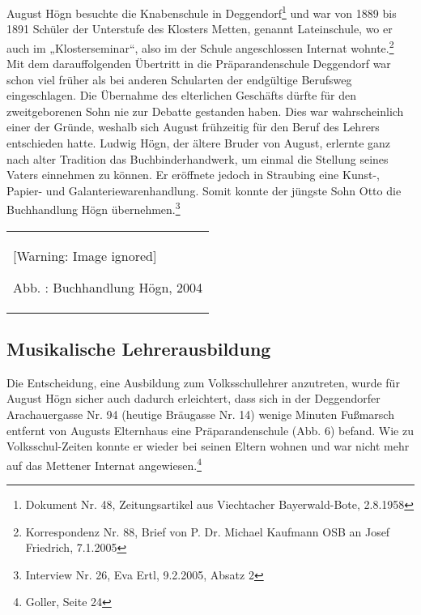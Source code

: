 \documentclass[a4paper]{article}
\newcounter{Abb}
\renewcommand\theAbb{\arabic{Abb}}
\begin{document}
August Högn besuchte die Knabenschule in Deggendorf\footnote{ Dokument
Nr. 48, Zeitungsartikel aus Viechtacher Bayerwald-Bote, 2.8.1958} und
war von 1889 bis 1891 Schüler der Unterstufe des Klosters Metten,
genannt Lateinschule, wo er auch im „Klosterseminar“, also im der
Schule angeschlossen Internat wohnte.\footnote{ Korrespondenz Nr. 88,
Brief von P. Dr. Michael Kaufmann OSB an Josef Friedrich, 7.1.2005} Mit
dem darauffolgenden Übertritt in die Präparandenschule Deggendorf war
schon viel früher als bei anderen Schularten der endgültige Berufsweg
eingeschlagen. Die Übernahme des elterlichen Geschäfts dürfte für den
zweitgeborenen Sohn nie zur Debatte gestanden haben. Dies war
wahrscheinlich einer der Gründe, weshalb sich August frühzeitig für den
Beruf des Lehrers entschieden hatte. Ludwig Högn, der ältere Bruder von
August, erlernte ganz nach alter Tradition das Buchbinderhandwerk, um
einmal die Stellung seines Vaters einnehmen zu können. Er eröffnete
jedoch in Straubing eine Kunst-, Papier- und Galanteriewarenhandlung.
Somit konnte der jüngste Sohn Otto die Buchhandlung Högn
übernehmen.\footnote{ Interview Nr. 26, Eva Ertl, 9.2.2005, Absatz 2}

\begin{center}
\begin{minipage}{5.95cm}
\begin{flushleft}
\tablefirsthead{}
\tablehead{}
\tabletail{}
\tablelasttail{}
\begin{supertabular}{m{5.75cm}}
  [Warning: Image ignored] %
 
\label{bkm:Ref100297337}Abb. \stepcounter{Abb}{\theAbb}: Buchhandlung
Högn, 2004\\
\end{supertabular}
\end{flushleft}
\end{minipage}
\end{center}
\subsection{Musikalische Lehrerausbildung}
\hypertarget{RefHeadingToc100333727}{}Die Entscheidung, eine Ausbildung
zum Volksschullehrer anzutreten, wurde für August Högn sicher auch
dadurch erleichtert, dass sich in der Deggendorfer Arachauergasse Nr.
94 (heutige Bräugasse Nr. 14) wenige Minuten Fußmarsch entfernt von
Augusts Elternhaus eine Präparandenschule (Abb. 6) befand. Wie zu
Volksschul-Zeiten konnte er wieder bei seinen Eltern wohnen und war
nicht mehr auf das Mettener Internat angewiesen.\footnote{ Goller,
Seite 24} 
\end{document}
